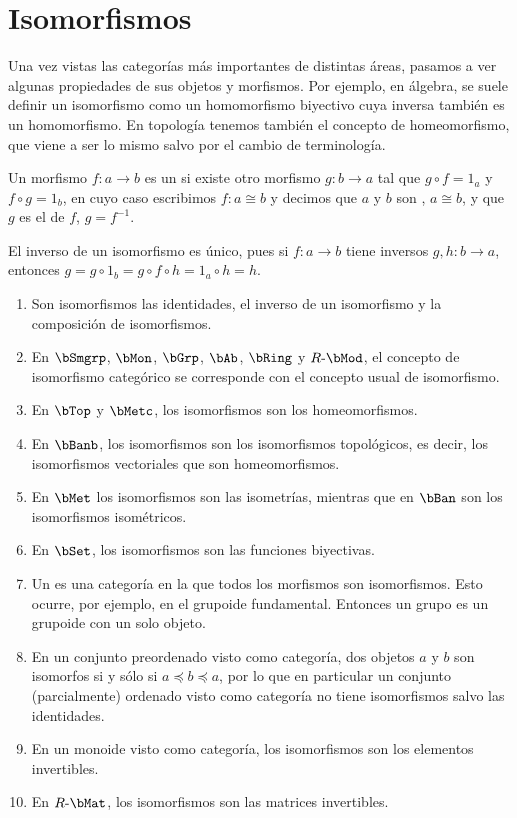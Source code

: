 \section{Isomorfismos}

Una vez vistas las categorías más importantes de distintas áreas, pasamos a ver
algunas propiedades de sus objetos y morfismos. Por ejemplo, en álgebra, se
suele definir un isomorfismo como un homomorfismo biyectivo cuya inversa también
es un homomorfismo. En topología tenemos también el concepto de homeomorfismo,
que viene a ser lo mismo salvo por el cambio de terminología.

\begin{definition}
  Un morfismo $f:a\to b$ es un  si existe otro morfismo
  $g:b\to a$ tal que $g\circ f=1_a$ y $f\circ g=1_b$, en cuyo caso escribimos
  $f:a\cong b$ y decimos que $a$ y $b$ son , $a\cong b$, y que
  $g$ es el  de $f$, $g=f^{-1}$.
\end{definition}

El inverso de un isomorfismo es único, pues si $f:a\to b$ tiene inversos
$g,h:b\to a$, entonces $g=g\circ 1_b=g\circ f\circ h=1_a\circ h=h$.

\begin{example}\;
  \begin{enumerate}
  \item Son isomorfismos las identidades, el inverso de un isomorfismo y la
    composición de isomorfismos.
  \item En $\bSmgrp$, $\bMon$, $\bGrp$, $\bAb$, $\bRing$ y $R\dash\bMod$, el
    concepto de isomorfismo categórico se corresponde con el concepto usual de
    isomorfismo.
  \item En $\bTop$ y $\bMetc$, los isomorfismos son los homeomorfismos.
  \item En $\bBanb$, los isomorfismos son los isomorfismos topológicos, es
    decir, los isomorfismos vectoriales que son homeomorfismos.
  \item En $\bMet$ los isomorfismos son las isometrías, mientras que en $\bBan$
    son los isomorfismos isométricos.
  \item En $\bSet$, los isomorfismos son las funciones biyectivas.
  \item Un  es una categoría en la que todos los morfismos son
    isomorfismos. Esto ocurre, por ejemplo, en el grupoide fundamental. Entonces
    un grupo es un grupoide con un solo objeto.
  \item En un conjunto preordenado visto como categoría, dos objetos $a$ y $b$
    son isomorfos si y sólo si $a\preceq b\preceq a$, por lo que en particular
    un conjunto (parcialmente) ordenado visto como categoría no tiene
    isomorfismos salvo las identidades.
  \item En un monoide visto como categoría, los isomorfismos son los elementos
    invertibles.
  \item En $R\dash\bMat$, los isomorfismos son las matrices invertibles.
  \end{enumerate}
\end{example}

